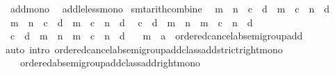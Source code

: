 \begin{isabellebody}
\ \ add{\isacharunderscore}{\kern0pt}mono\isanewline
\ \ add{\isacharunderscore}{\kern0pt}le{\isacharunderscore}{\kern0pt}less{\isacharunderscore}{\kern0pt}mono\isanewline
\isanewline
{}\isamarkupfalse%
\ {\isacharbrackleft}{\kern0pt}smt{\isacharunderscore}{\kern0pt}arith{\isacharunderscore}{\kern0pt}combine{\isacharbrackright}{\kern0pt}{\isacharcolon}{\kern0pt}\isanewline
\ \ {\isacartoucheopen}m\ {\isacharless}{\kern0pt}\ n\ {\isasymLongrightarrow}\ c\ {\isacharequal}{\kern0pt}\ d\ {\isasymLongrightarrow}\ m\ {\isacharplus}{\kern0pt}\ c\ {\isacharless}{\kern0pt}\ n\ {\isacharplus}{\kern0pt}\ d{\isacartoucheclose}\isanewline
\ \ {\isacartoucheopen}m\ {\isasymle}\ n\ {\isasymLongrightarrow}\ c\ {\isacharequal}{\kern0pt}\ d\ {\isasymLongrightarrow}\ m\ {\isacharplus}{\kern0pt}\ c\ {\isasymle}\ n\ {\isacharplus}{\kern0pt}\ d{\isacartoucheclose}\isanewline
\ \ {\isacartoucheopen}c\ {\isacharequal}{\kern0pt}\ d\ {\isasymLongrightarrow}\ m\ {\isacharless}{\kern0pt}\ n\ {\isasymLongrightarrow}\ m\ {\isacharplus}{\kern0pt}\ c\ {\isacharless}{\kern0pt}\ n\ {\isacharplus}{\kern0pt}\ d{\isacartoucheclose}\isanewline
\ \ {\isacartoucheopen}c\ {\isacharequal}{\kern0pt}\ d\ {\isasymLongrightarrow}\ m\ {\isasymle}\ n\ {\isasymLongrightarrow}\ m\ {\isacharplus}{\kern0pt}\ c\ {\isasymle}\ n\ {\isacharplus}{\kern0pt}\ d{\isacartoucheclose}\isanewline
\ \ \ m\ {\isacharcolon}{\kern0pt}{\isacharcolon}{\kern0pt}\ {\isacartoucheopen}{\isacharprime}{\kern0pt}a\ {\isacharcolon}{\kern0pt}{\isacharcolon}{\kern0pt}\ ordered{\isacharunderscore}{\kern0pt}cancel{\isacharunderscore}{\kern0pt}ab{\isacharunderscore}{\kern0pt}semigroup{\isacharunderscore}{\kern0pt}add{\isacartoucheclose}\isanewline
%
\isadelimproof
\ \ %
\endisadelimproof
%
\isatagproof
{}\isamarkupfalse%
\ {\isacharparenleft}{\kern0pt}auto\ intro{\isacharcolon}{\kern0pt}\ ordered{\isacharunderscore}{\kern0pt}cancel{\isacharunderscore}{\kern0pt}ab{\isacharunderscore}{\kern0pt}semigroup{\isacharunderscore}{\kern0pt}add{\isacharunderscore}{\kern0pt}class{\isachardot}{\kern0pt}add{\isacharunderscore}{\kern0pt}strict{\isacharunderscore}{\kern0pt}right{\isacharunderscore}{\kern0pt}mono\isanewline
\ \ \ \ ordered{\isacharunderscore}{\kern0pt}ab{\isacharunderscore}{\kern0pt}semigroup{\isacharunderscore}{\kern0pt}add{\isacharunderscore}{\kern0pt}class{\isachardot}{\kern0pt}add{\isacharunderscore}{\kern0pt}right{\isacharunderscore}{\kern0pt}mono{\isacharparenright}{\kern0pt}%
\endisatagproof
{\isafoldproof}%
%
\isadelimproof
\isanewline
%
\endisadelimproof
\isanewline
{}\isamarkupfalse%

\end{isabellebody}
